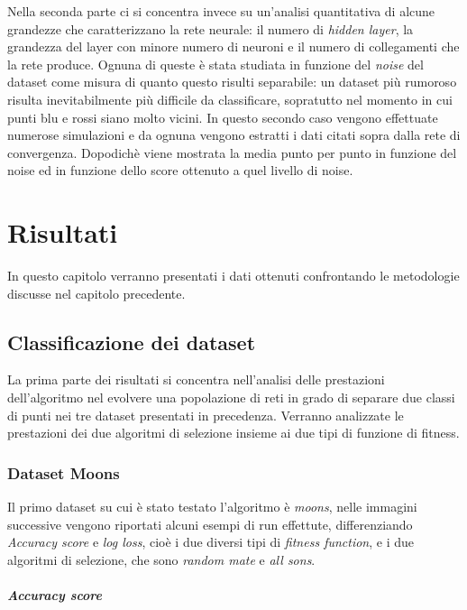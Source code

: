 \documentclass[12pt,a4paper]{report}
\begin{document}
Nella seconda parte ci si concentra invece su un'analisi quantitativa di alcune grandezze che caratterizzano la rete neurale: il numero di \textit{hidden layer}, la grandezza del layer con minore numero di neuroni e il numero di collegamenti che la rete produce.
Ognuna di queste è stata studiata in funzione del \textit{noise} del dataset come misura di quanto questo risulti separabile: un dataset più rumoroso risulta inevitabilmente più difficile da classificare, sopratutto nel momento in cui punti blu e rossi siano molto vicini.
In questo secondo caso vengono effettuate numerose simulazioni e da ognuna vengono estratti i dati citati sopra dalla rete di convergenza.
Dopodichè viene mostrata la media punto per punto in funzione del noise ed in funzione dello score ottenuto a quel livello di noise.

\chapter{Risultati}

In questo capitolo verranno presentati i dati ottenuti confrontando le  metodologie discusse nel capitolo precedente.

\section{Classificazione dei dataset}

La prima parte dei risultati si concentra nell'analisi delle prestazioni dell'algoritmo nel evolvere una popolazione di reti in grado di separare due classi di punti nei tre dataset presentati in precedenza. Verranno analizzate le prestazioni dei due algoritmi di selezione insieme ai due tipi di funzione di fitness.

\subsection{Dataset Moons}

Il primo dataset su cui è stato testato l'algoritmo è \textit{moons}, nelle immagini successive vengono riportati alcuni esempi di run effettute, differenziando \textit{Accuracy score} e \textit{log loss}, cioè i due diversi tipi di \textit{fitness function}, e i due algoritmi di selezione, che sono \textit{random mate} e \textit{all sons}.
 
\paragraph{Accuracy score}
 
\end{document}
